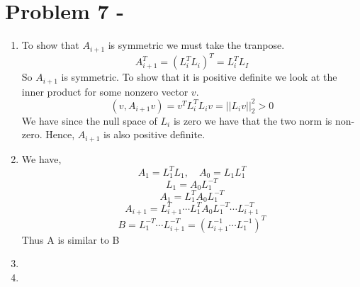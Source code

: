 \documentclass{article}
\begin{document}
\section{Problem 7 - }

\begin{enumerate}
\item
To show that $A_{i+1}$ is symmetric we must take the tranpose.
\[
    A_{i+1}^T = (L_i^TL_i)^T = L_i^TL_I
\]
So $A_{i+1}$ is symmetric. 
To show that it is positive definite we look at the inner product for some nonzero vector $v$.
\[
    (v, A_{i+1}v) = v^TL_i^TL_iv = ||L_iv||_2^2 > 0
\]
We have since the null space of $L_i$ is zero we have that the two norm is non-zero. Hence, $A_{i+1}$ is also positive definite.

\item
We have, 
\[
    A_1 = L_1^TL_1, \quad A_0 = L_1L_1^T
\]
\[
    L_1 = A_0L_1^{-T}
\]
\[
    A_1 = L_1^TA_0L_1^{-T}
\]
\[
    A_{i+1} = L_{i+1}^T\cdots L_1^TA_0L_1^{-T}\cdots L_{i+1}^{-T}
\]
\[
    B = L_1^{-T}\cdots L_{i+1}^{-T} = (L_{i+1}^{-1}\cdots L_{1}^{-1})^T
\]
Thus A is similar to B

\item 

\item 

\end{enumerate}
\end{document}
